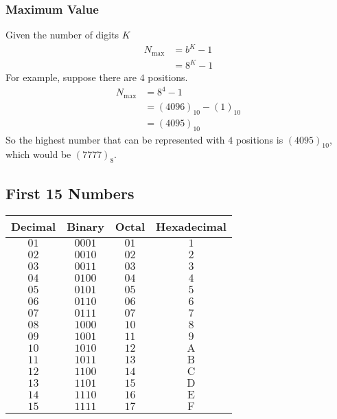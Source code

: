 \documentclass[../notes.tex]{subfiles}
\begin{document}
				\subsubsection{Maximum Value}
					Given the number of digits $K$
					\begin{align*}
						N_{\max} &= b^{K} - 1\\
						&= 8^{K} - 1
					\end{align*}
					For example, suppose there are $4$ positions.
					\begin{align*}
						N_{\max} &= 8^{4} - 1\\
						&= (4096)_{10} - (1)_{10}\\
						&= (4095)_{10}
					\end{align*}
					So the highest number that can be represented with $4$ positions is $(4095)_{10}$, which would be $(7777)_{8}$.
			\subsection{First 15 Numbers}
			\begin{table}[h]
				\centering
				\begin{tabular}{cccc}
					\toprule
					Decimal & Binary & Octal & Hexadecimal\\
					\midrule
					$01$ & $0001$ & $01$ & $1$\\
					$02$ & $0010$ & $02$ & $2$\\
					$03$ & $0011$ & $03$ & $3$\\
					$04$ & $0100$ & $04$ & $4$\\
					$05$ & $0101$ & $05$ & $5$\\
					$06$ & $0110$ & $06$ & $6$\\
					$07$ & $0111$ & $07$ & $7$\\
					$08$ & $1000$ & $10$ & $8$\\
					$09$ & $1001$ & $11$ & $9$\\
					$10$ & $1010$ & $12$ & $\mathrm{A}$\\
					$11$ & $1011$ & $13$ & $\mathrm{B}$\\
					$12$ & $1100$ & $14$ & $\mathrm{C}$\\
					$13$ & $1101$ & $15$ & $\mathrm{D}$\\
					$14$ & $1110$ & $16$ & $\mathrm{E}$\\
					$15$ & $1111$ & $17$ & $\mathrm{F}$\\
					\bottomrule
				\end{tabular}
			\end{table}
		\pagebreak
\end{document}

